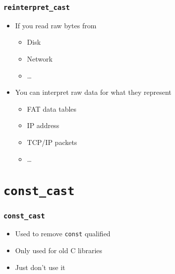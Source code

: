 \documentclass{../ucll-slides}
\begin{document}
\begin{frame}
  \frametitle{{\tt reinterpret\_cast}}
   \begin{itemize}
    \item If you read raw bytes from
          \begin{itemize}
            \item Disk
            \item Network
            \item \dots
          \end{itemize}
    \item You can interpret raw data for what they represent
          \begin{itemize}
            \item FAT data tables
            \item IP address
            \item TCP/IP packets
            \item \dots
          \end{itemize}
  \end{itemize}
\end{frame}

\section{{\tt const\_cast}}

\frame{\tableofcontents[currentsection]}

\begin{frame}
  \frametitle{{\tt const\_cast}}
  \begin{itemize}
    \item Used to remove {\tt const} qualified
    \item Only used for old C libraries
    \item Just don't use it
  \end{itemize}
\end{frame}
\end{document}
